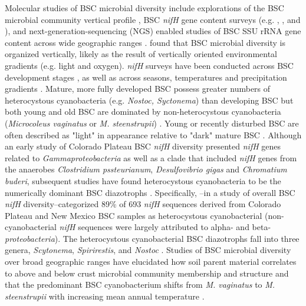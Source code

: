 Molecular studies of BSC microbial diversity include explorations of the BSC
microbial community vertical profile \citep{Garcia_Pichel_2003}, BSC
\textit{nifH} gene content surveys (e.g. \citet{14766579}, \citet{Yeager_2012},
\citet{Yeager} and \citet{Steppe_1996}), and next-generation-sequencing (NGS)
enabled studies of BSC SSU rRNA gene content across wide geographic ranges
\citep{Garcia_Pichel_2013, Steven_2013}. \citet{Garcia_Pichel_2003} found that
BSC microbial diversity is organized vertically, likely as the result of
vertically oriented environmental gradients (e.g. light and oxygen).
\textit{nifH} surveys have been conducted across BSC development stages
\citep{14766579}, as well as across seasons, temperatures and precipitation
gradients \citep{Yeager_2012}. Mature, more fully developed BSC possess greater
numbers of heterocystous cyanobacteria (e.g. \textit{Nostoc, Syctonema}) than
developing BSC but both young and old BSC are dominated by non-heterocystous
cyanobacteria (\textit{Microcoleus vaginatus} or \textit{M. steenstrupii})
\citep{14766579, Garcia_Pichel_2013}. Young or recently disturbed BSC are often
described as "light" in appearance relative to "dark" mature BSC
\citep{Belnap_2002}.  Although an early study of Colorado Plateau BSC
\textit{nifH} diversity presented \textit{nifH} genes related to
\textit{Gammaproteobacteria} as well as a clade that included \textit{nifH}
genes from the anaerobes \textit{Clostridium pssteurianum},
\textit{Desulfovibrio gigas} and \textit{Chromatium buderi}, subsequent studies
have found heterocystous cyanobacteria to be the numerically dominant BSC
diazotrophs \citep{Yeager, 14766579, Yeager_2012}. Specifically,
\citet{Yeager}--in a study of overall BSC \textit{nifH} diversity--categorized
89\% of 693 \textit{nifH} sequences derived from Colorado Plateau and New
Mexico BSC samples as heterocystous cyanobacterial (non-cyanobacterial
\textit{nifH} sequences were largely attributed to alpha- and beta-
\textit{proteobacteria}). The heterocystous cyanobacterial BSC diazotrophs fall
into three genera, \textit{Scytonema}, \textit{Spirirestis}, and
\textit{Nostoc} \citep{Yeager, Yeager_2012}. Studies of BSC microbial diversity
over broad geographic ranges have elucidated how soil parent material
correlates to above and below crust microbial community membership and
structure \citep{Steven_2013} and that the predominant BSC cyanobacterium shifts
from \textit{M. vaginatus} to \textit{M. steenstrupii} with increasing mean
annual temperature \citep{Garcia_Pichel_2013}.

